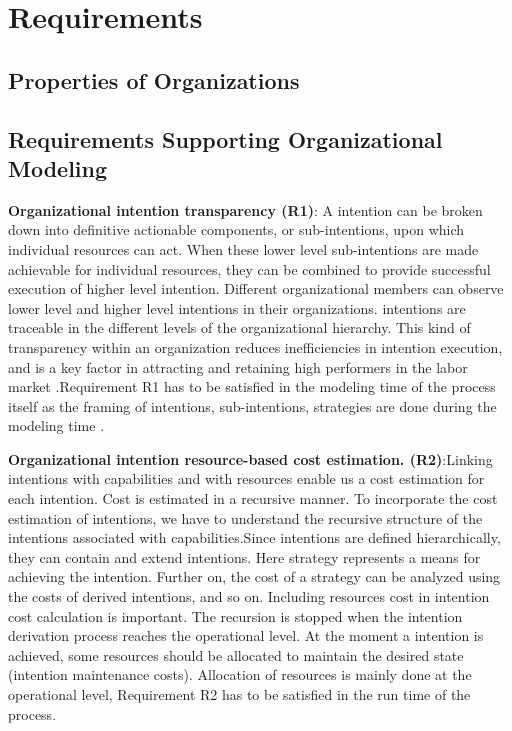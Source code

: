 \chapter{Requirements}
\label{chap:requirements}

\section{Properties of Organizations}
\label{sec:propertiesorganization}


\section{Requirements Supporting Organizational Modeling}
\label{sec:requirementssupoorting}

\hspace{4ex} \textbf{Organizational intention transparency (R1)}:  A intention can be broken down into definitive actionable components, or sub-intentions, upon which individual resources can act. When these lower level sub-intentions are made  achievable for individual resources, they can be combined to provide successful execution of higher level intention. Different organizational members can observe lower level and higher level intentions in their organizations. intentions are traceable in the different levels of the organizational hierarchy. This kind of transparency within an organization reduces inefficiencies in intention execution, and is a key factor in attracting and retaining high  performers in the labor market \cite{McManus2007}.Requirement R1 has to be satisfied in the modeling time of the process itself as the framing of intentions, sub-intentions, strategies are done during the modeling time .

\hspace{4ex} \textbf{Organizational intention resource-based cost estimation. (R2)}:Linking intentions with capabilities and with resources enable us a cost estimation for each intention. Cost is estimated in a recursive manner. To incorporate the cost estimation of intentions, we have to understand the recursive structure of the intentions associated with capabilities.Since intentions are defined hierarchically, they can contain and extend intentions. Here strategy represents a means for achieving the intention. Further on, the cost of a strategy can be analyzed using the costs of derived  intentions, and so on. Including resources cost in intention cost calculation is important. The recursion is stopped when the intention derivation process reaches the operational
level. At the moment a  intention is achieved, some resources should be allocated to maintain the desired state (intention maintenance costs)\cite{Mandic2010}. Allocation of resources is mainly done at the operational level, Requirement R2 has to be satisfied in the run time of the process.

